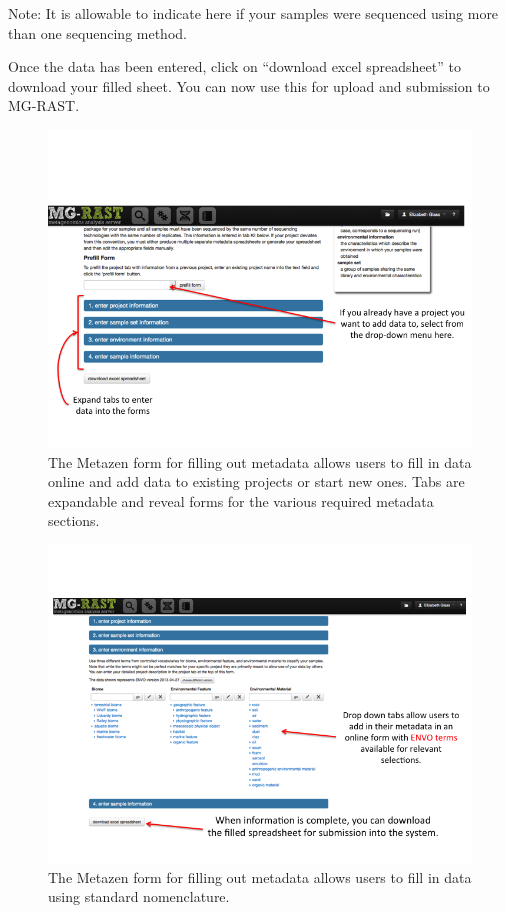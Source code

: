 \documentclass[12pt,fullpage]{report}
\begin{document}
Note: It is allowable to indicate here if your samples were sequenced using more than one sequencing method.

Once the data has been entered, click on “download excel spreadsheet” to download your filled sheet. You can now use this for upload and submission to MG-RAST.

\begin{figure}
\begin{center}
\includegraphics[width=6in]{Images/metazen_form.png}
\end{center} 
\caption{The Metazen form for filling out metadata allows users to fill in data online and add data to existing projects or start new ones. Tabs are expandable and reveal forms for the various required metadata sections.}
\label{fig:metazen_form}
\end{figure}

\begin{figure}
\begin{center}
\includegraphics[width=6in]{Images/metazen_expanded.png}
\end{center} 
\caption{The Metazen form for filling out metadata allows users to fill in data using standard nomenclature.}
\label{fig:metazen_expanded}
\end{figure}
\end{document}
